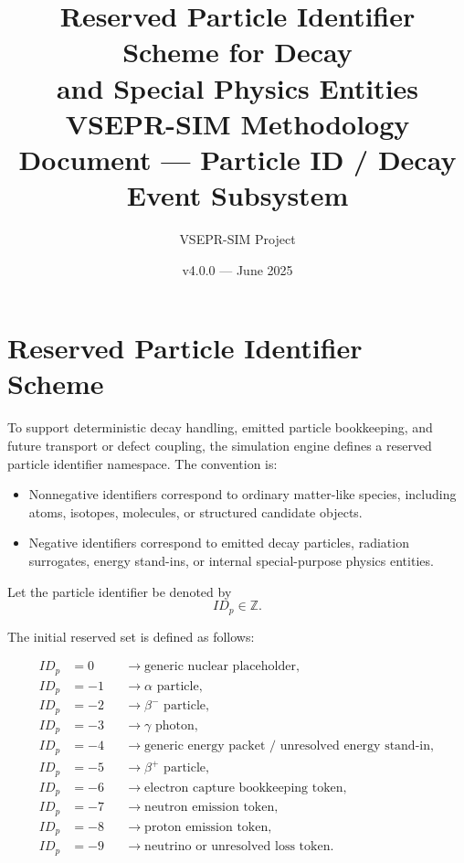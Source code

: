 \documentclass[11pt,a4paper]{article}
\title{Reserved Particle Identifier Scheme for Decay\\
and Special Physics Entities\\[6pt]
\large VSEPR-SIM Methodology Document --- Particle ID / Decay Event Subsystem}
\author{VSEPR-SIM Project}
\date{v4.0.0 --- June 2025}
\begin{document}
\maketitle
\tableofcontents
\newpage

\section{Reserved Particle Identifier Scheme}
\label{sec:particle-id}

To support deterministic decay handling, emitted particle bookkeeping, and future transport or defect coupling, the simulation engine defines a reserved particle identifier namespace. The convention is:

\begin{itemize}
    \item Nonnegative identifiers correspond to ordinary matter-like species, including atoms, isotopes, molecules, or structured candidate objects.
    \item Negative identifiers correspond to emitted decay particles, radiation surrogates, energy stand-ins, or internal special-purpose physics entities.
\end{itemize}

Let the particle identifier be denoted by
\[
ID_p \in \mathbb{Z}.
\]

The initial reserved set is defined as follows:

\[
\begin{aligned}
ID_p &= 0   &&\rightarrow \text{generic nuclear placeholder},\\
ID_p &= -1  &&\rightarrow \alpha \text{ particle},\\
ID_p &= -2  &&\rightarrow \beta^- \text{ particle},\\
ID_p &= -3  &&\rightarrow \gamma \text{ photon},\\
ID_p &= -4  &&\rightarrow \text{generic energy packet / unresolved energy stand-in},\\
ID_p &= -5  &&\rightarrow \beta^+ \text{ particle},\\
ID_p &= -6  &&\rightarrow \text{electron capture bookkeeping token},\\
ID_p &= -7  &&\rightarrow \text{neutron emission token},\\
ID_p &= -8  &&\rightarrow \text{proton emission token},\\
ID_p &= -9  &&\rightarrow \text{neutrino or unresolved loss token}.
\end{aligned}
\]
\end{document}
